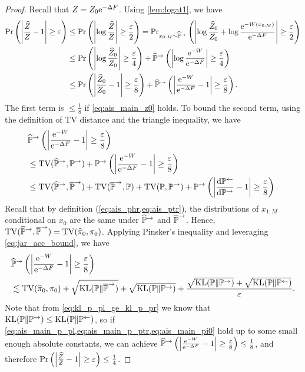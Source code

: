 \begin{proof}
    Recall that $Z=Z_0\mathrm{e}^{-\Delta F}$. Using \cref{lem:logat1}, we have
    \begin{align*}
        \operatorname{Pr}\left(\left|\frac{\widehat{Z}}{Z}-1\right|\ge\varepsilon\right) & \le\operatorname{Pr}\left(\left|\log\frac{\widehat{Z}}{Z}\right|\ge\frac{\varepsilon}{2}\right)=\operatorname{Pr}_{x_{0:M}\sim\widehat{\mathbb{P}}^\to}\left(\left|\log\frac{\widehat{Z}_0}{Z_0}+\log\frac{\mathrm{e}^{-W(x_{0:M})}}{\mathrm{e}^{-\Delta F}}\right|\ge\frac{\varepsilon}{2}\right) \\
                                                   & \le\operatorname{Pr}\left(\left|\log\frac{\widehat{Z}_0}{Z_0}\right|\ge\frac{\varepsilon}{4}\right)+\widehat{\mathbb{P}}^\to\left(\left|\log\frac{\mathrm{e}^{-W}}{\mathrm{e}^{-\Delta F}}\right|\ge\frac{\varepsilon}{4}\right)                   \\
                                                   & \le\operatorname{Pr}\left(\left|\frac{\widehat{Z}_0}{Z_0}-1\right|\ge\frac{\varepsilon}{8}\right)+\widehat{\mathbb{P}}^\to\left(\left|\frac{\mathrm{e}^{-W}}{\mathrm{e}^{-\Delta F}}-1\right|\ge\frac{\varepsilon}{8}\right).
    \end{align*}
    The first term is $\le\frac{1}{8}$ if \cref{eq:ais_main_z0} holds. To bound the second term, using the definition of TV distance and the triangle inequality, we have
    \begin{align*}
        &\widehat{\mathbb{P}}^\to\left(\left|\frac{\mathrm{e}^{-W}}{\mathrm{e}^{-\Delta F}}-1\right|\ge\frac{\varepsilon}{8}\right) \\
        & \le\operatorname{TV}(\widehat{\mathbb{P}}^\to,\mathbb{P}^\to)+\mathbb{P}^\to\left(\left|\frac{\mathrm{e}^{-W}}{\mathrm{e}^{-\Delta F}}-1\right|\ge\frac{\varepsilon}{8}\right)                              \\
                                                                                    & \le\operatorname{TV}(\widehat{\mathbb{P}}^\to,\overline{\mathbb{P}}^\to)+\operatorname{TV}(\overline{\mathbb{P}}^\to,\mathbb{P})+\operatorname{TV}(\mathbb{P},\mathbb{P}^\to)+\mathbb{P}^\to\left(\left|\frac{\mathrm{d}\mathbb{P}^\gets}{\mathrm{d}\mathbb{P}^\to}-1\right|\ge\frac{\varepsilon}{8}\right).
    \end{align*}
    Recall that by definition (\cref{eq:ais_phr,eq:ais_ptr}), the distributions of $x_{1:M}$ conditional on $x_0$ are the same under $\widehat{\mathbb{P}}^\to$ and $\overline{\mathbb{P}}^\to$. Hence, $\operatorname{TV}(\widehat{\mathbb{P}}^\to,\overline{\mathbb{P}}^\to)=\operatorname{TV}(\widehat{\pi}_0,\pi_0)$. Applying Pinsker's inequality and leveraging \cref{eq:jar_acc_bound}, we have
    \begin{align*}
        & \widehat{\mathbb{P}}^\to\left(\left|\frac{\mathrm{e}^{-W}}{\mathrm{e}^{-\Delta F}}-1\right|\ge\frac{\varepsilon}{8}\right) \\
                                                                                    & \lesssim\operatorname{TV}(\widehat{\pi}_0,\pi_0)+\sqrt{\operatorname{KL}(\mathbb{P}\|\overline{\mathbb{P}}^\to)}+\sqrt{\operatorname{KL}(\mathbb{P}\|\mathbb{P}^\to)}+\frac{\sqrt{\operatorname{KL}(\mathbb{P}\|\mathbb{P}^\to)}+\sqrt{\operatorname{KL}(\mathbb{P}\|\mathbb{P}^\gets)}}{\varepsilon}.
    \end{align*}
    Note that from \cref{eq:kl_p_pl_ge_kl_p_pr} we know that $\operatorname{KL}(\mathbb{P}\|\mathbb{P}^\to)\le\operatorname{KL}(\mathbb{P}\|\mathbb{P}^\gets)$, so if \cref{eq:ais_main_p_pl,eq:ais_main_p_ptr,eq:ais_main_pi0} hold up to some small enough absolute constants, we can achieve $\widehat{\mathbb{P}}^\to\left(\left|\frac{\mathrm{e}^{-W}}{\mathrm{e}^{-\Delta F}}-1\right|\ge\frac{\varepsilon}{8}\right)\le\frac{1}{8}$, and therefore $\operatorname{Pr}\left(\left|\frac{\widehat{Z}}{Z}-1\right|\ge\varepsilon\right)\le\frac{1}{4}$.
\end{proof}

